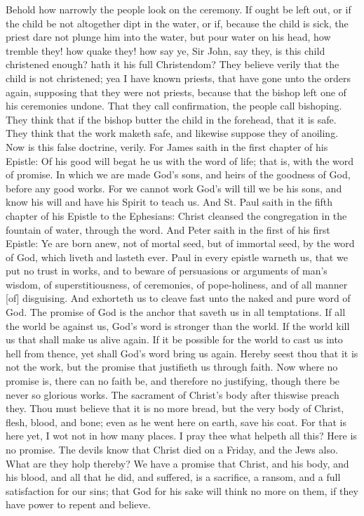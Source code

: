 Behold how narrowly the people look on the ceremony. 
If ought be left out, or if the child be not altogether dipt 
in the water, or if, because the child is sick, the priest 
dare not plunge him into the water, but pour water on his 
head, how tremble they! how quake they! how say ye, 
Sir John, say they, is this child christened enough? hath it 
his full Christendom? They believe verily that the child 
is not christened; yea I have known priests, that have 
gone unto the orders again, supposing that they were not 
priests, because that the bishop left one of his ceremonies 
undone. That they call confirmation, the people call bishoping.
They think that if the bishop butter the child 
in the forehead, that it is safe. They think that the work 
maketh safe, and likewise suppose they of anoiling. Now 
is this false doctrine, verily. For James saith in the first 
chapter of his Epistle: Of his good will begat he us with 
the word of life; that is, with the word of promise. In 
which we are made God's sons, and heirs of the goodness 
of God, before any good works. For we cannot work 
God's will till we be his sons, and know his will and 
have his Spirit to teach us. And St. Paul saith in the 
fifth chapter of his Epistle to the Ephesians: Christ 
cleansed the congregation in the fountain of water, through 
the word. And Peter saith in the first of his first Epistle: 
Ye are born anew, not of mortal seed, but of immortal 
seed, by the word of God, which liveth and lasteth ever. 
Paul in every epistle warneth us, that we put no trust in 
works, and to beware of persuasions or arguments of man's 
wisdom, of superstitiousness, of ceremonies, of pope-holiness,
and of all manner [of] disguising. And exhorteth 
us to cleave fast unto the naked and pure word of God. 
The promise of God is the anchor that saveth us in all 
temptations. If all the world be against us, God's word 
is stronger than the world. If the world kill us that shall 
make us alive again. If it be possible for the world to 
cast us into hell from thence, yet shall God's word bring 
us again. Hereby seest thou that it is not the work, but 
the promise that justifieth us through faith. Now where 
no promise is, there can no faith be, and therefore no justifying,
though there be never so glorious works. The 
sacrament of Christ's body after thiswise preach they. 
Thou must believe that it is no more bread, but the very 
body of Christ, flesh, blood, and bone; even as he went 
here on earth, save his coat. For that is here yet, I wot 
not in how many places. I pray thee what helpeth all 
this? Here is no promise. The devils know that Christ 
died on a Friday, and the Jews also. What are they holp 
thereby? We have a promise that Christ, and his body, 
and his blood, and all that he did, and suffered, is a sacrifice,
a ransom, and a full satisfaction for our sins; that 
God for his sake will think no more on them, if they have 
power to repent and believe. 

